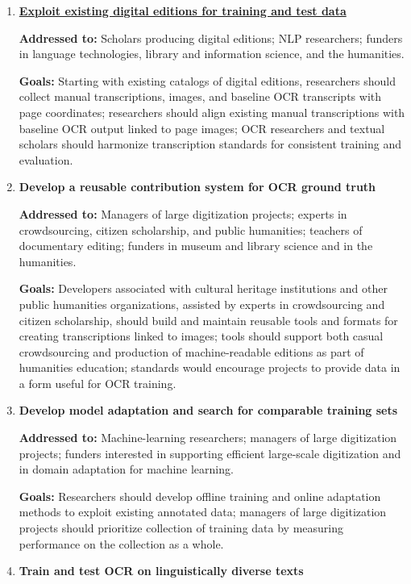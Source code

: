 \documentclass[twoside,11pt]{report}
\begin{document}
\begin{enumerate}
\item \hyperref[sec:rec-editions]{\textbf{Exploit existing digital editions for training and test data}}

\textbf{Addressed to:} Scholars producing digital editions; NLP researchers; funders in language technologies, library and information science, and the humanities.

\textbf{Goals:} Starting with existing catalogs of digital editions, researchers should collect manual transcriptions, images, and baseline OCR transcripts with page coordinates; researchers should align existing manual transcriptions with baseline OCR output linked to page images; OCR researchers and textual scholars should harmonize transcription standards for consistent training and evaluation.

\item \textbf{Develop a reusable contribution system for OCR ground truth}

\textbf{Addressed to:} Managers of large digitization projects; experts in crowdsourcing, citizen scholarship, and public humanities; teachers of documentary editing; funders in museum and library science and in the humanities.

\textbf{Goals:} Developers associated with cultural heritage institutions and other public humanities organizations, assisted by experts in crowdsourcing and citizen scholarship, should build and maintain reusable tools and formats for creating transcriptions linked to images; tools should support both casual crowdsourcing and production of machine-readable editions as part of humanities education; standards would encourage projects to provide data in a form useful for OCR training.

\item \textbf{Develop model adaptation and search for comparable training sets}

\textbf{Addressed to:} Machine-learning researchers; managers of large digitization projects; funders interested in supporting efficient large-scale digitization and in domain adaptation for machine learning.

\textbf{Goals:} Researchers should develop offline training and online adaptation methods to exploit existing annotated data; managers of large digitization projects should prioritize collection of training data by measuring performance on the collection as a whole.

\item \textbf{Train and test OCR on linguistically diverse texts}


\end{enumerate}
\end{document}
